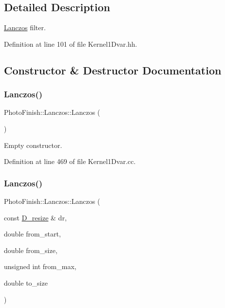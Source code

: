 \subsection{Detailed Description}
\hyperlink{class_photo_finish_1_1_lanczos}{Lanczos} filter. 

Definition at line 101 of file Kernel1\+Dvar.\+hh.



\subsection{Constructor \& Destructor Documentation}
\mbox{\label{class_photo_finish_1_1_lanczos_af55b793ca07b3aa2f3dd01e7281c43ef}} 
\subsubsection{\texorpdfstring{Lanczos()}{Lanczos()}\hspace{0.1cm}{\footnotesize\ttfamily [1/2]}}
{\footnotesize\ttfamily Photo\+Finish\+::\+Lanczos\+::\+Lanczos (\begin{DoxyParamCaption}{ }\end{DoxyParamCaption})}



Empty constructor. 



Definition at line 469 of file Kernel1\+Dvar.\+cc.

\mbox{\label{class_photo_finish_1_1_lanczos_a9d7b8430316c1ae142ee05464362792c}} 
\subsubsection{\texorpdfstring{Lanczos()}{Lanczos()}\hspace{0.1cm}{\footnotesize\ttfamily [2/2]}}
{\footnotesize\ttfamily Photo\+Finish\+::\+Lanczos\+::\+Lanczos (\begin{DoxyParamCaption}\item[{const \hyperlink{class_photo_finish_1_1_d__resize}{D\+\_\+resize} \&}]{dr,  }\item[{double}]{from\+\_\+start,  }\item[{double}]{from\+\_\+size,  }\item[{unsigned int}]{from\+\_\+max,  }\item[{double}]{to\+\_\+size }\end{DoxyParamCaption})}



